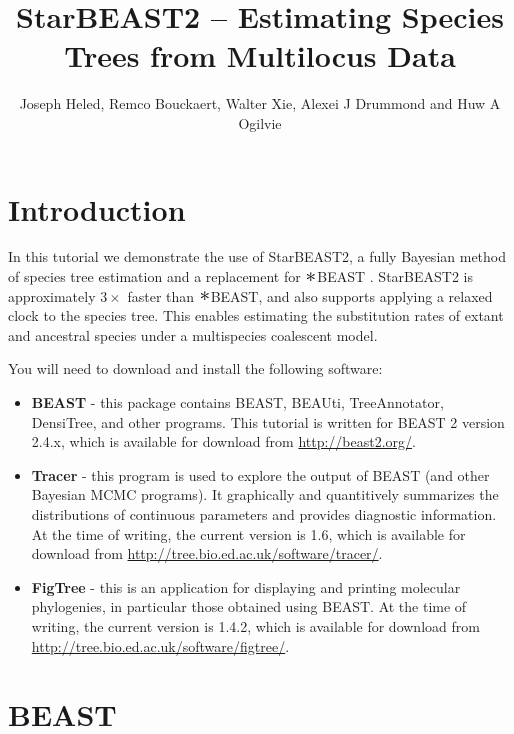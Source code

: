 \documentclass{article}
\newcommand{\BEASTVersion}{2.4.x}
\newcommand{\TracerVersion}{1.6}
\newcommand{\FigTreeVersion}{1.4.2}
\newcommand{\Conv}{\mathop{\scalebox{1.5}{$\ast$}}}
\begin{document}
\title{StarBEAST2 -- Estimating Species Trees from Multilocus Data}

\author{Joseph Heled, Remco Bouckaert, Walter Xie, Alexei J Drummond and Huw A Ogilvie}

\maketitle

\section{Introduction}

In this tutorial we demonstrate the use of StarBEAST2, a fully Bayesian method
of species tree estimation and a replacement for $\Conv$BEAST
\citep{Heled01032010}. StarBEAST2 is approximately $3\times$ faster than $\Conv$BEAST,
and also supports applying a relaxed clock to the species tree. This enables
estimating the substitution rates of extant and ancestral species under a
multispecies coalescent model.

You will need to download and install the following software:

\begin{itemize}
\item \textbf{BEAST} - this package contains BEAST, BEAUti,
TreeAnnotator, DensiTree, and other programs. This tutorial is written
for BEAST 2 \citep{10.1371/journal.pcbi.1003537} version {\BEASTVersion}, which is available for download from
\url{http://beast2.org/}.
\item \textbf{Tracer} - this program is used to explore the output of BEAST (and
other Bayesian MCMC programs). It graphically and quantitively summarizes the
distributions of continuous parameters and provides diagnostic information. At
the time of writing, the current version is {\TracerVersion}, which is available
for download from \url{http://tree.bio.ed.ac.uk/software/tracer/}.
\item \textbf{FigTree} - this is an application for displaying and printing
molecular phylogenies, in particular those obtained using BEAST. At the time of
writing, the current version is {\FigTreeVersion}, which is available for download
from \url{http://tree.bio.ed.ac.uk/software/figtree/}.
\end{itemize}

\section{BEAST}
\end{document}
